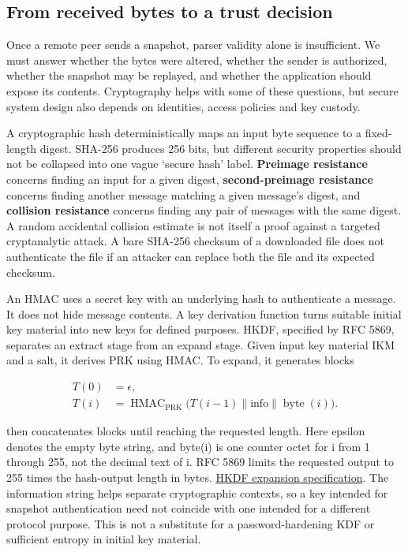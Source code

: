 \subsection{From received bytes to a trust decision}\label{06-engine-ii-ch042-from-received-bytes-to-a-trust-decision}

\hypertarget{06-engine-ii-ch042-from-received-bytes-to-a-trust-decision}{}

Once a remote peer sends a snapshot, parser validity alone is insufficient. We must answer whether the bytes were altered, whether the sender is authorized, whether the snapshot may be replayed, and whether the application should expose its contents. Cryptography helps with some of these questions, but secure system design also depends on identities, access policies and key custody.

A cryptographic hash deterministically maps an input byte sequence to a fixed-length digest. SHA-256 produces 256 bits, but different security properties should not be collapsed into one vague `secure hash' label. \textbf{Preimage resistance} concerns finding an input for a given digest, \textbf{second-preimage resistance} concerns finding another message matching a given message's digest, and \textbf{collision resistance} concerns finding any pair of messages with the same digest. A random accidental collision estimate is not itself a proof against a targeted cryptanalytic attack. A bare SHA-256 checksum of a downloaded file does not authenticate the file if an attacker can replace both the file and its expected checksum.

An HMAC uses a secret key with an underlying hash to authenticate a message. It does not hide message contents. A key derivation function turns suitable initial key material into new keys for defined purposes. HKDF, specified by RFC 5869, separates an extract stage from an expand stage. Given input key material IKM and a salt, it derives PRK using HMAC. To expand, it generates blocks

\[
\begin{aligned}
T(0)&=\epsilon,\\
T(i)&=\operatorname{HMAC}_{\mathrm{PRK}}
\bigl(T(i-1)\parallel\mathrm{info}\parallel\operatorname{byte}(i)\bigr).
\end{aligned}
\]

then concatenates blocks until reaching the requested length. Here epsilon denotes the empty byte string, and byte(i) is one counter octet for i from 1 through 255, not the decimal text of i. RFC 5869 limits the requested output to 255 times the hash-output length in bytes. \href{https://www.rfc-editor.org/rfc/rfc5869.html\#section-2.3}{HKDF expansion specification}. The information string helps separate cryptographic contexts, so a key intended for snapshot authentication need not coincide with one intended for a different protocol purpose. This is not a substitute for a password-hardening KDF or sufficient entropy in initial key material.

